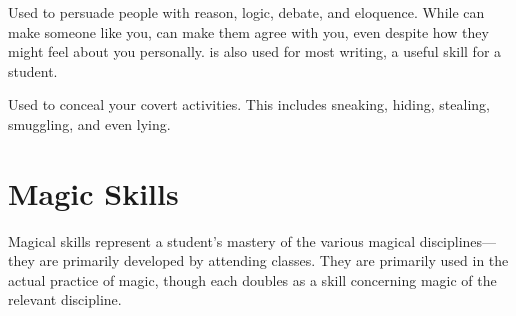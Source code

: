 
Used to persuade people with reason, logic, debate, and eloquence.
While  can make someone like you,  can make them agree with you, even despite how they might feel about you personally.
 is also used for most writing, a useful skill for a student.


Used to conceal your covert activities.
This includes sneaking, hiding, stealing, smuggling, and even lying.

\section{Magic Skills}

Magical skills represent a student's mastery of the various magical disciplines---they are primarily developed by attending classes.
They are primarily used in the actual practice of magic, though each doubles as a  skill concerning magic of the relevant discipline.
